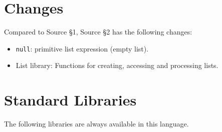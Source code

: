 





\section{Changes}

Compared to Source \S 1, Source \S 2 has the following changes:
\begin{itemize}
\item \lstinline{null}: primitive list expression (empty list).
\item List library: Functions for creating, accessing and processing lists.
\end{itemize}

\newpage





















\section{Standard Libraries}

The following libraries are always available in this language.









\newpage



    
